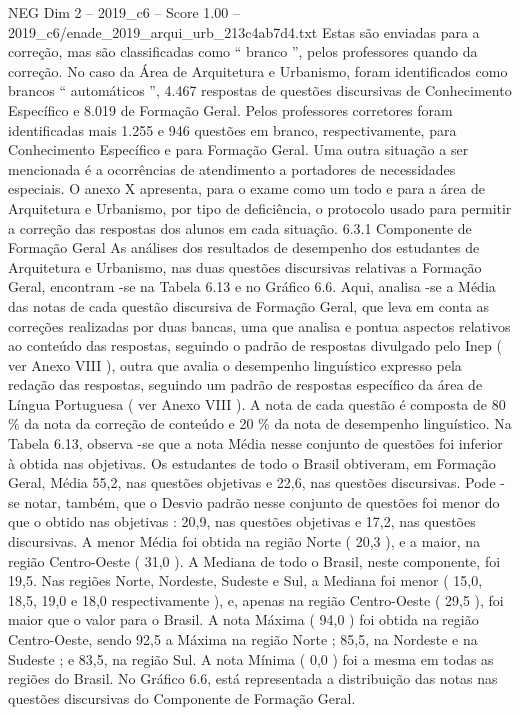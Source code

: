 \begin{textsample}{NEG Dim 2 – 2019\_c6 – Score 1.00 – 2019\_c6/enade\_2019\_arqui\_urb\_213c4ab7d4.txt}
Estas são enviadas para a correção, mas são classificadas como “ branco ”, pelos professores quando da correção.
No caso da Área de Arquitetura e Urbanismo, foram identificados como brancos “ automáticos ”, 4.467 respostas de questões discursivas de Conhecimento Específico e 8.019 de Formação Geral.
Pelos professores corretores foram identificadas mais 1.255 e 946 questões em branco, respectivamente, para Conhecimento Específico e para Formação Geral.
Uma outra situação a ser mencionada é a ocorrências de atendimento a portadores de necessidades especiais.
O anexo X apresenta, para o exame como um todo e para a área de Arquitetura e Urbanismo, por tipo de deficiência, o protocolo usado para permitir a correção das respostas dos alunos em cada situação. 6.3.1 Componente de Formação Geral As análises dos resultados de desempenho dos estudantes de Arquitetura e Urbanismo, nas duas questões discursivas relativas a Formação Geral, encontram -se na Tabela 6.13 e no Gráfico 6.6.
Aqui, analisa -se a Média das notas de cada questão discursiva de Formação Geral, que leva em conta as correções realizadas por duas bancas, uma que analisa e pontua aspectos relativos ao conteúdo das respostas, seguindo o padrão de respostas divulgado pelo Inep ( ver Anexo VIII ), outra que avalia o desempenho linguístico expresso pela redação das respostas, seguindo um padrão de respostas específico da área de Língua Portuguesa ( ver Anexo VIII ).
A nota de cada questão é composta de 80 \% da nota da correção de conteúdo e 20 \% da nota de desempenho linguístico.
Na Tabela 6.13, observa -se que a nota Média nesse conjunto de questões foi inferior à obtida nas objetivas.
Os estudantes de todo o Brasil obtiveram, em Formação Geral, Média 55,2, nas questões objetivas e 22,6, nas questões discursivas.
Pode -se notar, também, que o Desvio padrão nesse conjunto de questões foi menor do que o obtido nas objetivas : 20,9, nas questões objetivas e 17,2, nas questões discursivas.
A menor Média foi obtida na região Norte ( 20,3 ), e a maior, na região Centro-Oeste ( 31,0 ).
A Mediana de todo o Brasil, neste componente, foi 19,5.
Nas regiões Norte, Nordeste, Sudeste e Sul, a Mediana foi menor ( 15,0, 18,5, 19,0 e 18,0 respectivamente ), e, apenas na região Centro-Oeste ( 29,5 ), foi maior que o valor para o Brasil.
A nota Máxima ( 94,0 ) foi obtida na região Centro-Oeste, sendo 92,5 a Máxima na região Norte ; 85,5, na Nordeste e na Sudeste ; e 83,5, na região Sul.
A nota Mínima ( 0,0 ) foi a mesma em todas as regiões do Brasil.
No Gráfico 6.6, está representada a distribuição das notas nas questões discursivas do Componente de Formação Geral.

\end{textsample}
